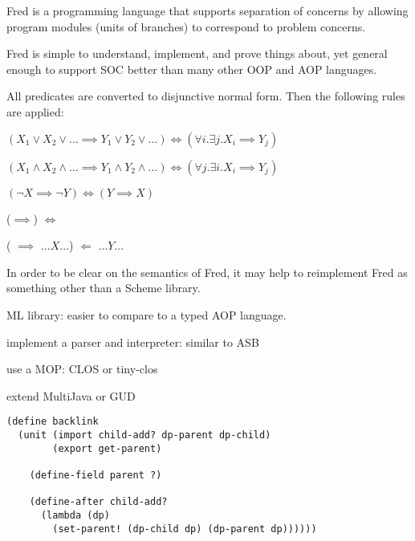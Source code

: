 \documentclass[landscape]{slides}
\begin{document}
\begin{slide}
Fred is a programming language that supports separation of concerns by
allowing program modules (units of branches) to correspond to problem
concerns.

Fred is simple to understand, implement, and prove things about,
yet general enough to support SOC better than many other
OOP and AOP languages.
\end{slide}

\begin{slide}
\end{slide}

\begin{slide}
All predicates are converted to disjunctive normal form.  Then the
following rules are applied:
\begin{bullets}
\item $(X_1 \vee X_2 \vee \ldots \implies Y_1 \vee Y_2 \vee \ldots)
\iff (\forall i. \exists j. X_i \implies Y_j)$
\item $(X_1 \wedge X_2 \wedge \ldots \implies Y_1 \wedge Y_2 \wedge \ldots)
\iff (\forall j. \exists i. X_i \implies Y_j)$
\item $(\neg X \implies \neg Y) \iff (Y \implies X)$
\item ($\implies$)
$\iff$ 
\item ( $\implies$ \code{(}$\ldots X \ldots$\code{)})
$\Longleftarrow$ \code{(}$\ldots Y \ldots$\code{)}
\end{bullets}
\end{slide}

\begin{slide}
In order to be clear on the semantics of Fred, it may help to
reimplement Fred as something other than a Scheme library.
\begin{bullets}
\item ML library: easier to compare to a typed AOP language.
\item implement a parser and interpreter: similar to ASB
\item use a MOP: CLOS or tiny-clos
\item extend MultiJava or GUD
\end{bullets}
\end{slide}

\begin{slide}
\begin{verbatim}
(define backlink
  (unit (import child-add? dp-parent dp-child)
        (export get-parent)

    (define-field parent ?)

    (define-after child-add?
      (lambda (dp)
        (set-parent! (dp-child dp) (dp-parent dp))))))
\end{verbatim}
\end{slide}
\end{document}
